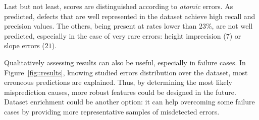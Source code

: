 \documentclass[runningheads]{llncs}
\begin{document}
Last but not least, scores are distinguished according to \textit{atomic} errors. As predicted, defects that are well represented in the dataset achieve high recall and precision values. The others, being present at rates lower than $23\%$, are not well predicted, especially in the case of very rare errors: height imprecision ($7$) or slope errors ($21$).

Qualitatively assessing results can also be useful, especially in failure cases. In Figure~\ref{fig::results}, knowing studied errors distribution over the dataset, most erroneous predictions are explained. Thus, by determining the most likely misprediction causes, more robust features could be designed in the future. Dataset enrichment could be another option: it can help overcoming some failure cases by providing more representative samples of misdetected errors.
\end{document}
